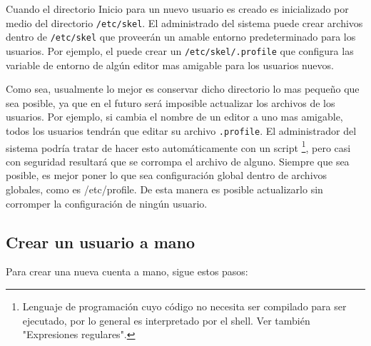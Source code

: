 Cuando el directorio Inicio para un nuevo usuario es creado es
inicializado por medio del directorio \texttt{/etc/skel}. El
administrado del sistema puede crear archivos dentro de
\texttt{/etc/skel} que proveerán un amable entorno predeterminado
para los usuarios. Por ejemplo, el puede crear un
\texttt{/etc/skel/.profile} que configura  las variable de entorno
de algún editor mas amigable para los usuarios nuevos.


Como sea, usualmente lo mejor es conservar dicho directorio lo mas pequeño
que sea posible, ya que en el futuro será imposible actualizar los archivos de
los usuarios. Por ejemplo, si cambia el nombre de un editor a uno mas amigable,
todos los usuarios tendrán que editar su archivo  \texttt{.profile}.
El administrador del sistema podría tratar de hacer esto automáticamente con un
script \footnote{Lenguaje de programación cuyo código no necesita ser
compilado para ser ejecutado, por lo general es interpretado por el shell.
Ver también "Expresiones regulares".}, pero
	casi con seguridad resultará que se corrompa el archivo de
alguno.  Siempre que sea posible, es mejor poner lo que sea configuración global
dentro de archivos globales, como es /etc/profile. De esta manera es posible
actualizarlo sin corromper la configuración de ningún usuario.  






\subsection{Crear un usuario a mano}

Para crear una nueva cuenta a mano, sigue estos pasos:

